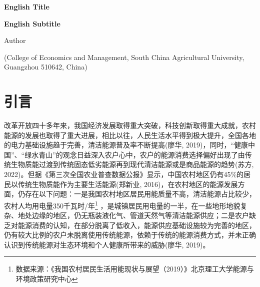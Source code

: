 \documentclass[a4paper, 12pt, oneside]{article} %
\begin{document}
	\newpage
	\begin{center}
		{\textbf{\large{English Title}}} 
		
		{\textbf{\large{English Subtitle}}}
		
		Author
		
		(College of Economics and Management, South China Agricultural University, Guangzhou 510642, China)
	\end{center}
		
			
		
	\newpage
	\setcounter{page}{1}
	\begin{titlepage}
		\tableofcontents %
	\end{titlepage}
	\newpage
	\setcounter{page}{1}
	\section{引言}
	改革开放四十多年来，我国经济发展取得重大突破，科技创新取得重大成就，农村能源的发展也取得了重大进展，相比以往，人民生活水平得到极大提升，全国各地的电力基础设施趋于完善，清洁能源普及率不断提高(廖华, 2019)，同时，“健康中国”、“绿水青山”的观念日益深入农户心中，农户的能源消费选择偏好出现了由传统生物质能过渡到传统固态低劣能源再到现代清洁能源或是商品能源的趋势(苏方, 2022)。但据《第三次全国农业普查数据公报》显示，中国农村地区仍有45\%的居民以传统生物质能作为主要生活能源(郑新业, 2016)，在农村地区的能源发展方面，仍存在以下问题：一是我国农村地区居民用能质量不高，清洁能源占比较少，农村人均用电量350千瓦时/年\footnote{数据来源：《我国农村居民生活用能现状与展望（2019）》北京理工大学能源与环境政策研究中心} ，是城镇居民用电量的一半，在一些地形地貌复杂、地处边缘的地区，仍无瓶装液化气、管道天然气等清洁能源供应；二是农户缺乏对能源消费的认知，在部分脱离了低收入，能源供应基础设施较为完善的地区，仍有较大比例的农户未脱离使用传统能源，依赖于传统的能源消费方式，并未正确认识到传统能源对生态环境和个人健康所带来的威胁(廖华, 2019)。
	
\end{document}
